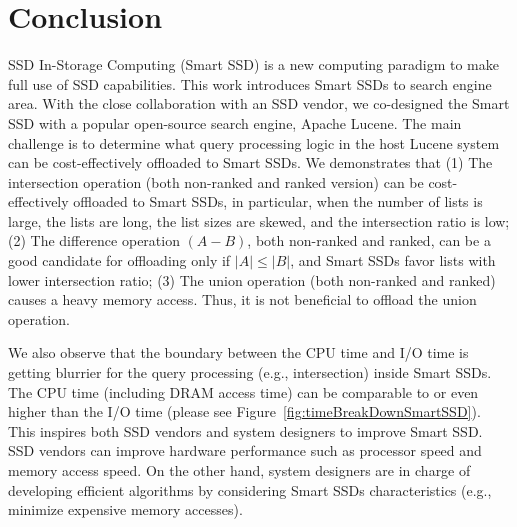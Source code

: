 \section{Conclusion}\label{sec:conclusion}
SSD In-Storage Computing (Smart SSD) is a new computing paradigm to make full use of SSD capabilities.
This work introduces Smart SSDs to search engine area. With the close collaboration with an SSD vendor, we co-designed the Smart SSD with a popular open-source search engine, Apache Lucene.
The main challenge is to determine what query processing logic in the host Lucene system can be cost-effectively offloaded to Smart SSDs. 
We demonstrates that (1) The intersection operation (both non-ranked and ranked version) can be cost-effectively offloaded to Smart SSDs, in particular, when the number of lists is large, the lists are long, the list sizes are skewed, and the intersection ratio is low; (2) The difference operation $(A-B)$, both non-ranked and ranked, can be a good candidate for offloading only if $|A| \le |B|$, and Smart SSDs favor lists with lower intersection ratio; (3) The union operation (both non-ranked and ranked) causes a heavy memory access. Thus, it is not beneficial to offload the union operation.


We also observe that the boundary between the CPU time and I/O time is getting blurrier for the query processing (e.g., intersection) inside Smart SSDs. The CPU time (including DRAM access time) can be comparable to or even higher than the I/O time (please see Figure~\ref{fig:timeBreakDownSmartSSD}). This inspires both SSD vendors and system designers to improve Smart SSD. 
SSD vendors can improve hardware performance such as processor speed and memory access speed. On the other hand, system designers are in charge of developing efficient algorithms by considering Smart SSDs characteristics (e.g., minimize expensive memory accesses).


